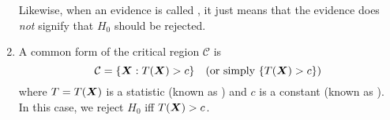 \begin{enumerate}
\begin{note}
Likewise, when an evidence is called , it
just means that the evidence does \emph{not} signify that \(H_0\) should be
rejected.
\end{note}

\item A common form of the critical region \(\mathcal{C}\) is
\[
\mathcal{C}=\{\vb*{X}:T(\vb*{X})>c\}\quad(\text{or simply \(\{T(\vb*{X})>c\}\)})
\]
where \(T=T(\vb*{X})\) is a statistic (known as ) and
\(c\) is a constant (known as ). In this case, we reject
\(H_0\) iff \(T(\vb*{X})>c\).

\end{enumerate}

